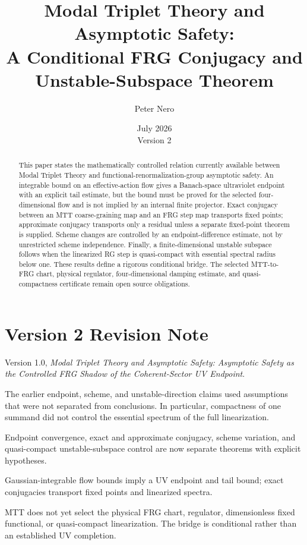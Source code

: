 \documentclass[11pt]{article}
\title{Modal Triplet Theory and Asymptotic Safety:\\
\large A Conditional FRG Conjugacy and Unstable-Subspace Theorem}
\author{Peter Nero}
\date{July 2026\\Version 2}
\theoremstyle{definition}
\theoremstyle{remark}
\begin{document}
\maketitle

\begin{abstract}
This paper states the mathematically controlled relation currently available
between Modal Triplet Theory and functional-renormalization-group
asymptotic safety. An integrable bound on an effective-action flow gives a
Banach-space ultraviolet endpoint with an explicit tail estimate, but the
bound must be proved for the selected four-dimensional flow and is not
implied by an internal finite projector. Exact conjugacy between an MTT
coarse-graining map and an FRG step map transports fixed points; approximate
conjugacy transports only a residual unless a separate fixed-point theorem is
supplied. Scheme changes are controlled by an endpoint-difference estimate,
not by unrestricted scheme independence. Finally, a finite-dimensional
unstable subspace follows when the linearized RG step is quasi-compact with
essential spectral radius below one. These results define a rigorous
conditional bridge. The selected MTT-to-FRG chart, physical regulator,
four-dimensional damping estimate, and quasi-compactness certificate remain
open source obligations.
\end{abstract}

\section*{Version 2 Revision Note}
\begin{description}[leftmargin=3.2cm,style=nextline]
\item[Supersedes] Version 1.0, \emph{Modal Triplet Theory and Asymptotic
Safety: Asymptotic Safety as the Controlled FRG Shadow of the
Coherent-Sector UV Endpoint}.
\item[Reason] The earlier endpoint, scheme, and unstable-direction claims
used assumptions that were not separated from conclusions. In particular,
compactness of one summand did not control the essential spectrum of the
full linearization.
\item[Resolution] Endpoint convergence, exact and approximate conjugacy,
scheme variation, and quasi-compact unstable-subspace control are now
separate theorems with explicit hypotheses.
\item[Retained result] Gaussian-integrable flow bounds imply a UV endpoint
and tail bound; exact conjugacies transport fixed points and linearized
spectra.
\item[Remaining boundary] MTT does not yet select the physical FRG chart,
regulator, dimensionless fixed functional, or quasi-compact linearization.
The bridge is conditional rather than an established UV completion.
\end{description}
\end{document}
